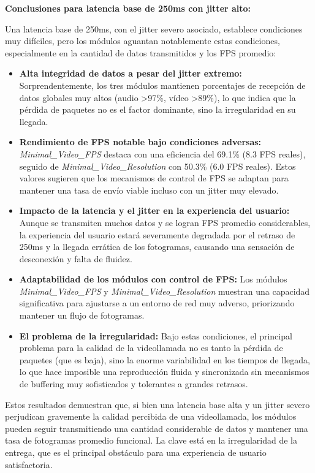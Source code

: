\vspace{\baselineskip}

\textbf{Conclusiones para latencia base de 250ms con jitter alto:}

Una latencia base de 250ms, con el jitter severo asociado, establece condiciones muy difíciles, pero los módulos aguantan notablemente estas condiciones, especialmente en la cantidad de datos transmitidos y los FPS promedio:

\begin{itemize}
\item \textbf{Alta integridad de datos a pesar del jitter extremo:} Sorprendentemente, los tres módulos mantienen porcentajes de recepción de datos globales muy altos (audio >97\%, vídeo >89\%), lo que indica que la pérdida de paquetes no es el factor dominante, sino la irregularidad en su llegada.
\item \textbf{Rendimiento de FPS notable bajo condiciones adversas:} \textit{Minimal\_Video\_FPS} destaca con una eficiencia del 69.1\% (8.3 FPS reales), seguido de \textit{Minimal\_Video\_Resolution} con 50.3\% (6.0 FPS reales). Estos valores sugieren que los mecanismos de control de FPS se adaptan para mantener una tasa de envío viable incluso con un jitter muy elevado.
\item \textbf{Impacto de la latencia y el jitter en la experiencia del usuario:} Aunque se transmiten muchos datos y se logran FPS promedio considerables, la experiencia del usuario estará severamente degradada por el retraso de 250ms y la llegada errática de los fotogramas, causando una sensación de desconexión y falta de fluidez.
\item \textbf{Adaptabilidad de los módulos con control de FPS:} Los módulos \textit{Minimal\_Video\_FPS} y \textit{Minimal\_Video\_Resolution} muestran una capacidad significativa para ajustarse a un entorno de red muy adverso, priorizando mantener un flujo de fotogramas.
\item \textbf{El problema de la irregularidad:} Bajo estas condiciones, el principal problema para la calidad de la videollamada no es tanto la pérdida de paquetes (que es baja), sino la enorme variabilidad en los tiempos de llegada, lo que hace imposible una reproducción fluida y sincronizada sin mecanismos de buffering muy sofisticados y tolerantes a grandes retrasos.
\end{itemize}

Estos resultados demuestran que, si bien una latencia base alta y un jitter severo perjudican gravemente la calidad percibida de una videollamada, los módulos pueden seguir transmitiendo una cantidad considerable de datos y mantener una tasa de fotogramas promedio funcional. La clave está en la irregularidad de la entrega, que es el principal obstáculo para una experiencia de usuario satisfactoria.
\newpage

